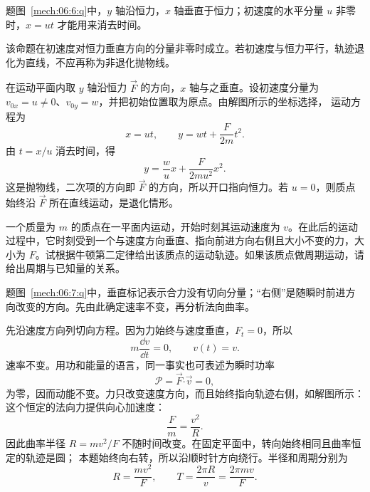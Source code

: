 {\begin{xesolution}题图~\ref{mech:06:6:q}中，$y$ 轴沿恒力，$x$ 轴垂直于恒力；初速度的水平分量 $u$ 非零时，$x=ut$ 才能用来消去时间。

该命题在初速度对恒力垂直方向的分量非零时成立。若初速度与恒力平行，轨迹退化为直线，不应再称为非退化抛物线。

在运动平面内取 $y$ 轴沿恒力 $\vec F$ 的方向，$x$ 轴与之垂直。设初速度分量为 $v_{0x}=u\ne0$、$v_{0y}=w$，并把初始位置取为原点。由解图所示的坐标选择，
\soldiagTwoSix
运动方程为
\[
  x=ut,
  \qquad
  y=wt+\frac{F}{2m}t^2.
\]
由 $t=x/u$ 消去时间，得
\[
  \boxed{y=\frac wu x+\frac{F}{2mu^2}x^2}.
\]
这是抛物线，二次项的方向即 $\vec F$ 的方向，所以开口指向恒力。若 $u=0$，则质点始终沿 $\vec F$ 所在直线运动，是退化情形。
\end{xesolution}

\begin{origexamplebox}{}\label{ch06:ex:s04-2-7}
一个质量为 $m$ 的质点在一平面内运动，开始时刻其运动速度为 $v$。在此后的运动过程中，它时刻受到一个与速度方向垂直、指向前进方向右侧且大小不变的力，大小为 $F$。试根据牛顿第二定律给出该质点的运动轨迹。如果该质点做周期运动，请给出周期与已知量的关系。

\begin{qualityfigure}
\label{mech:06:7:q}
\end{qualityfigure}
\end{origexamplebox}

\begin{xesolution}题图~\ref{mech:06:7:q}中，垂直标记表示合力没有切向分量；“右侧”是随瞬时前进方向改变的方向。先由此确定速率不变，再分析法向曲率。

先沿速度方向列切向方程。因为力始终与速度垂直，$F_t=0$，所以
\[
 m\frac{\dd v}{\dd t}=0,\qquad v(t)=v.
\]
速率不变。用功和能量的语言，同一事实也可表述为瞬时功率
\[
  \mathcal P=\vec F\mathbin{\boldsymbol\cdot}\vec v=0,
\]
为零，因而动能不变。力只改变速度方向，而且始终指向轨迹右侧，如解图所示：
\soldiagTwoSeven
这个恒定的法向力提供向心加速度：
\[
  \frac{F}{m}=\frac{v^2}{R}.
\]
因此曲率半径 $R=mv^2/F$ 不随时间改变。在固定平面中，转向始终相同且曲率恒定的轨迹是圆；
本题始终向右转，所以沿顺时针方向绕行。半径和周期分别为
\[
  \boxed{R=\frac{mv^2}{F}},
  \qquad
  \boxed{T=\frac{2\pi R}{v}=\frac{2\pi mv}{F}}.
\]
\end{xesolution}

}
